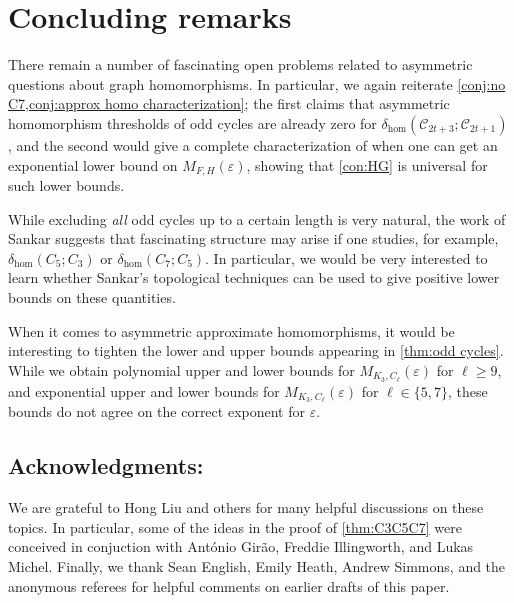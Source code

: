 \documentclass[reqno, english, 12pt]{amsart}
\theoremstyle{plain}
\theoremstyle{remark}
\renewcommand{\geq}{\geqslant}
\newcommand\C{\mathscr{C}}
\begin{document}
\section{Concluding remarks}\label{sec:conclusion}
There remain a number of fascinating open problems related to asymmetric questions about graph homomorphisms. In particular, we again reiterate \cref{conj:no C7,conj:approx homo characterization}; the first claims that asymmetric homomorphism thresholds of odd cycles are already zero for $\delta_{\hom}(\C_{2t+3};\C_{2t+1})$, and the second would give a complete characterization of when one can get an exponential lower bound on $M_{F,H}(\varepsilon)$, showing that \cref{con:HG} is universal for such lower bounds.

While excluding \emph{all} odd cycles up to a certain length is very natural, the work of Sankar \cite{2206.07525} suggests that fascinating structure may arise if one studies, for example, $\delta_{\hom}(C_5;C_3)$ or $\delta_{\hom}(C_7;C_5)$. In particular, we would be very interested to learn whether Sankar's topological techniques can be used to give positive lower bounds on these quantities.

When it comes to asymmetric approximate homomorphisms, it would be interesting to tighten the lower and upper bounds appearing in \cref{thm:odd cycles}. While we obtain polynomial upper and lower bounds for $M_{K_3,C_\ell}(\varepsilon)$ for $\ell \geq 9$, and exponential upper and lower bounds for $M_{K_3,C_\ell}(\varepsilon)$ for $\ell \in \{5,7\}$, these bounds do not agree on the correct exponent for $\varepsilon$. 

\subsection*{Acknowledgments:} We are grateful to  Hong Liu and others for many helpful discussions on these topics. In particular, some of the ideas in the proof of \cref{thm:C3C5C7} were conceived in conjuction with Ant\'onio Gir\~ao, Freddie Illingworth, and Lukas Michel. Finally, we thank Sean English, Emily Heath, Andrew Simmons, and the anonymous referees for helpful comments on earlier drafts of this paper.
	
	
\end{document}
